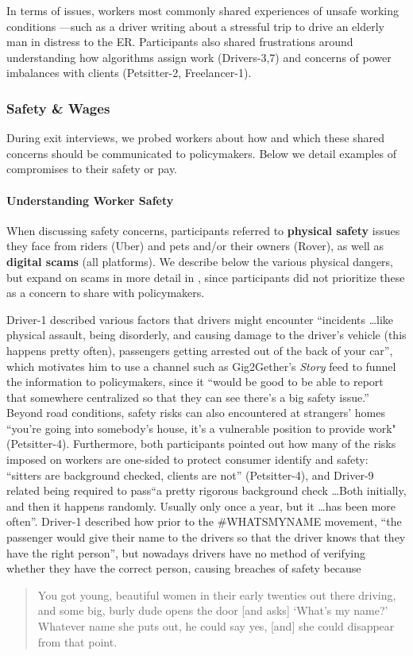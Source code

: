 In terms of issues, workers most commonly shared experiences of unsafe working conditions ---such as a driver writing about a stressful trip to drive an elderly man in distress to the ER. 
Participants also shared frustrations around understanding how algorithms assign work (Drivers-3,7) and concerns of power imbalances with clients (Petsitter-2, Freelancer-1).

\subsubsection{{Safety \& Wages}} 

{During exit interviews, we probed workers about how and which these shared concerns should be communicated to policymakers.} Below we detail examples of compromises to their safety or pay. 

\paragraph{\textbf{Understanding Worker Safety}}
When discussing safety concerns, participants referred to \textbf{physical safety} issues they face from riders (Uber) and pets and/or their owners (Rover), as well as \textbf{digital scams} (all platforms). We describe below the various physical dangers, but expand on scams in more detail in , since participants did not prioritize these as a concern to share with policymakers.

Driver-1 described various factors that drivers might encounter ``incidents \dots like physical assault, being disorderly, and causing damage to the driver's vehicle (this happens pretty often), passengers getting arrested out of the back of your car'', which motivates him to use a channel such as Gig2Gether's \textit{Story} feed to funnel the information to policymakers, since it ``would be good to be able to report that somewhere centralized so that they can see there's a big safety issue.''
Beyond road conditions, safety risks can also encountered at strangers' homes ``you're going into somebody's house, it's a vulnerable position to provide work" (Petsitter-4). Furthermore, both participants pointed out how many of the risks imposed on workers are one-sided to protect consumer identify and safety: ``sitters are background checked, clients are not'' (Petsitter-4), and Driver-9 related being required to pass``a pretty rigorous background check \dots Both initially, and then it happens randomly. Usually only once a year, but it \dots has been more often''. Driver-1 described how prior to the \#WHATSMYNAME movement, ``the passenger would give their name to the drivers so that the driver knows that they have the right person'', but nowadays drivers have no method of verifying whether they have the correct person, causing breaches of safety because 
\begin{quote}
    You got young, beautiful women in their early twenties out there driving, and some big, burly dude opens the door [and asks] `What's my name?' Whatever name she puts out, he could say yes, [and] she could disappear from that point.
\end{quote}

